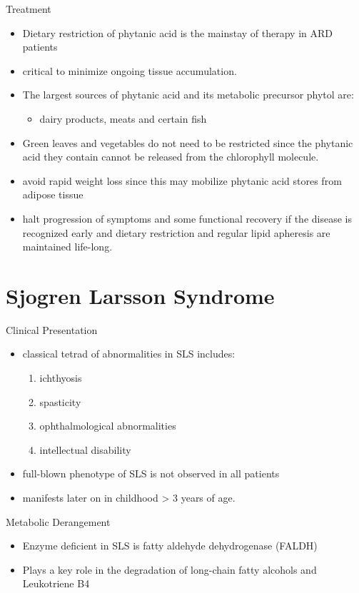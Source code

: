 \documentclass[presentation, smaller]{beamer}
\begin{document}
\begin{frame}[label={sec:org2dec925}]{Treatment}
\begin{itemize}
\item Dietary restriction of phytanic acid is the mainstay of therapy in ARD patients
\item critical to minimize ongoing tissue accumulation.
\item The largest sources of phytanic acid and its metabolic precursor phytol are:
\begin{itemize}
\item dairy products, meats and certain fish
\end{itemize}
\item Green leaves and vegetables do not need to be restricted since the
phytanic acid they contain cannot be released from the chlorophyll molecule.
\item avoid rapid weight loss since this may mobilize phytanic acid stores
from adipose tissue
\item halt progression of symptoms and some functional recovery if the
disease is recognized early and dietary restriction and regular
lipid apheresis are maintained life-long.
\end{itemize}
\end{frame}

\section{Sjogren Larsson Syndrome}
\label{sec:orgeccdbd7}
\begin{frame}[label={sec:org7bb1dbb}]{Clinical Presentation}
\begin{itemize}
\item classical tetrad of abnormalities in SLS includes:
\begin{enumerate}
\item ichthyosis
\item spasticity
\item ophthalmological abnormalities
\item intellectual disability
\end{enumerate}
\item full-blown phenotype of SLS is not observed in all patients
\item manifests later on in childhood \textgreater{} 3 years of age.
\end{itemize}
\end{frame}

\begin{frame}[label={sec:org79203f7}]{Metabolic Derangement}
\begin{itemize}
\item Enzyme deficient in SLS is fatty aldehyde dehydrogenase (FALDH)
\item Plays a key role in the degradation of long-chain fatty alcohols and
Leukotriene B4
\end{itemize}
\end{frame}
\end{document}
